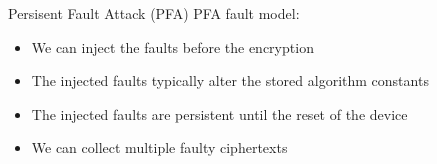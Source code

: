 \documentclass[table,aspectratio=169]{beamer}
\begin{document}
\begin{frame}{Persisent Fault Attack (PFA)}
PFA fault model\cite{tches_0010L0BHDQR18}:
\begin{itemize}
\item<1-> We can inject the faults before the encryption
\item<2-> The injected faults typically alter the stored algorithm constants
\item<3-> The injected faults are persistent until the reset of the device
\item<4-> We can collect multiple faulty ciphertexts
\end{itemize}
\end{frame}
\end{document}
